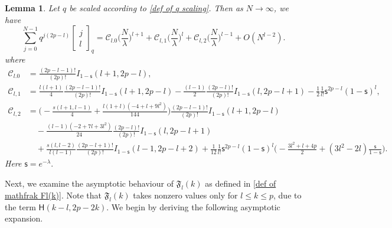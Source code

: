 \documentclass{amsart}
\newcommand{\qbinom}[2]{{\begin{bmatrix}#1\\#2\end{bmatrix}}_q}
\theoremstyle{plain}
\newtheorem{lem}[thm]{Lemma}
\theoremstyle{remark}
\numberwithin{equation}{section}
\begin{document}
\begin{lem}
\label{lem:sumj}
Let $q$ be scaled according to \eqref{def of q scaling}. Then as $N\rightarrow\infty$, we have   
\begin{equation}
    \sum_{j=0}^{N-1}q^{j(2p-l)}\qbinom{j}{l}
    =\mathcal{C}_{l.0}\Big(\frac{N}{\lambda}\Big)^{l+1}+\mathcal{C}_{l,1}\Big(\frac{N}{\lambda}\Big)^{l}+\mathcal{C}_{l,2}\Big(\frac{N}{\lambda}\Big)^{l-1}+O(N^{l-2}).
\end{equation}
where
\begin{align*}
    \mathcal{C}_{l.0}
    &=\frac{(2p-l-1)!}{(2p)!}I_{1- \mathsf{s} }(l+1,2p-l),
    \\
    \mathcal{C}_{l,1}&=\frac{l(l+1)}{4}\frac{(2p-l-1)!}{(2p)!}I_{1-  \mathsf{s} }(l+1,2p-l)  -\frac{(l-1)}{2}\frac{(2p-l)!}{(2p)!}I_{1- \mathsf{s} }(l,2p-l+1)-\frac{1}{2}\frac{1}{l!} \mathsf{s}^{ 2p-l }(1- \mathsf{s} )^{l}, 
        \\
    \mathcal{C}_{l,2}&= \Big(-\frac{s(l+1,l-1)}{4}+\frac{l(1+l)(-4+l+9l^{2})}{144}\Big)\frac{(2p-l-1)!}{(2p)!}I_{1-\mathsf{s} }(l+1,2p-l) 
        \\
        &\quad -\frac{(l-1)(-2+7l+3l^{2})}{24}\frac{(2p-l)!}{(2p)!}I_{1-\mathsf{s} }(l,2p-l+1)
         \\
        &\quad + \frac{s(l,l-2) }{l(l-1)}\frac{(2p-l+1)!}{(2p)!}I_{1-\mathsf{s} }(l-1,2p-l+2) 
     +\frac{1}{12}\frac{1}{l!} \mathsf{s}^{ 2p-l }(1- \mathsf{s} )^{l}\Big(-\frac{3l^2+l+4p}{2}+(3l^2-2l)\frac{  \mathsf{s} }{1- \mathsf{s} }\Big).
\end{align*}
Here $\mathsf{s}=e^{-\lambda}.$
\end{lem}

Next, we examine the asymptotic behaviour of $\mathfrak{F}_{l}(k)$ as defined in \eqref{def of mathfrak Fl(k)}.  
Note that $\mathfrak{F}_{l}(k)$ takes nonzero values only for $l \leq k \leq p$, due to the term $\mathsf{H}(k - l, 2p - 2k)$.  
We begin by deriving the following asymptotic expansion.
\end{document}
